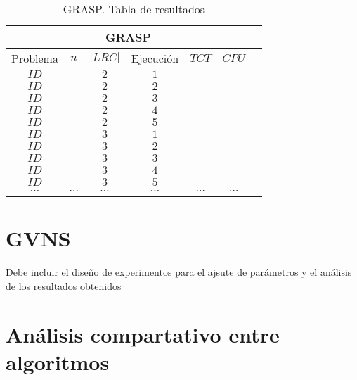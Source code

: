    \begin{table}[h]
   {\small
   \begin{center}
   \begin{tabular}{ccccccc}
      \multicolumn{6}{c}{GRASP} \\
      \hline
      Problema & $n$ &  $|LRC|$ & Ejecuci\'on & $TCT$ & $CPU$ \\
      \hline
      $ID$   &     &    $2$   & $1$      &       &       \\
      $ID$   &     &    $2$   & $2$      &       &       \\
      $ID$   &     &    $2$   & $3$      &       &       \\
      $ID$   &     &    $2$   & $4$      &       &       \\
      $ID$   &     &    $2$   & $5$      &       &       \\
      $ID$   &     &    $3$   & $1$      &       &       \\
      $ID$   &     &    $3$   & $2$      &       &       \\
      $ID$   &     &    $3$   & $3$      &       &       \\
      $ID$   &     &    $3$   & $4$      &       &       \\
      $ID$   &     &    $3$   & $5$      &       &       \\      
      $\cdots$ &$\cdots$ &$\cdots$ &$\cdots$ &$\cdots$ &$\cdots$ \\
      \hline
   \end{tabular}
   \end{center}
   }
   \caption{GRASP. Tabla de resultados}
   \end{table}



\section{GVNS}
Debe incluir el diseño de experimentos para el ajsute de parámetros y el análisis de los resultados obtenidos



\section{Análisis compartativo entre algoritmos}


